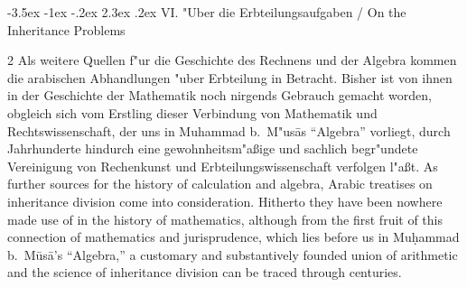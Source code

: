 \documentclass[10pt,a4paper]{article}
\makeatletter
\renewcommand{\switchcolumn}{\syncronize\nointerlineskip\columnbreak}
\renewcommand{\section}{\@startsection{section}{1}{\z@}%
  {-3.5ex \@plus -1ex \@minus -.2ex}%
  {2.3ex \@plus .2ex}%
  {\normalfont\Large\bfseries\color{sectioncolor}}}
\newcommand{\enquote}[1]{``#1''}
\makeatother
\begin{document}
\section{VI. "Uber die Erbteilungsaufgaben / On the Inheritance Problems}

\begin{paracol}{2}
Als weitere Quellen f"ur die Geschichte des Rechnens und der Algebra kommen die arabischen Abhandlungen "uber Erbteilung in Betracht. Bisher ist von ihnen in der Geschichte der Mathematik noch nirgends Gebrauch gemacht worden, obgleich sich vom Erstling dieser Verbindung von Mathematik und Rechtswissenschaft, der uns in Muhammad b.\ M"us\=as \enquote{Algebra} vorliegt, durch Jahrhunderte hindurch eine gewohnheitsm"a\ss{}ige und sachlich begr"undete Vereinigung von Rechenkunst und Erbteilungswissenschaft verfolgen l"a\ss{}t.
\switchcolumn
As further sources for the history of calculation and algebra, Arabic treatises on inheritance division come into consideration. Hitherto they have been nowhere made use of in the history of mathematics, although from the first fruit of this connection of mathematics and jurisprudence, which lies before us in Mu\d{h}ammad b.\ M\=us\=a's ``Algebra,'' a customary and substantively founded union of arithmetic and the science of inheritance division can be traced through centuries.
\end{paracol}
\end{document}
